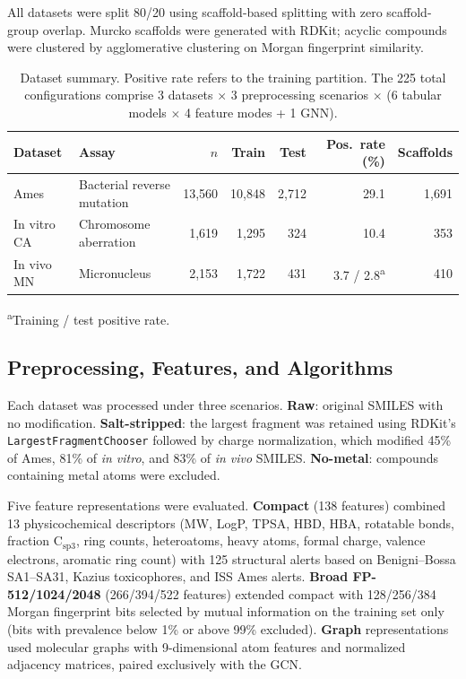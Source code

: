 \documentclass[journal=jacsat,manuscript=article]{achemso}
\begin{document}
All datasets were split 80/20 using scaffold-based splitting\cite{Sheridan_2013} with zero 
scaffold-group overlap. Murcko scaffolds\cite{Bemis_Murcko_1996} were generated with 
RDKit;\cite{RDKit} acyclic compounds were clustered by agglomerative clustering on Morgan 
fingerprint\cite{Rogers_Hahn_2010} similarity.

\begin{table}[ht]
\caption{Dataset summary. Positive rate refers to the training partition. The 225 total 
configurations comprise 3 datasets $\times$ 3 preprocessing scenarios $\times$ (6 tabular 
models $\times$ 4 feature modes + 1 GNN).}
\label{tab:datasets}
\centering
\small
\begin{tabular}{@{}llrrrrr@{}}
\toprule
Dataset & Assay & $n$ & Train & Test & Pos.\ rate (\%) & Scaffolds \\
\midrule
Ames       & Bacterial reverse mutation & 13,560 & 10,848 & 2,712 & 29.1             & 1,691 \\
In vitro CA & Chromosome aberration     &  1,619 &  1,295 &   324 & 10.4             &   353 \\
In vivo MN  & Micronucleus              &  2,153 &  1,722 &   431 & 3.7 / 2.8\textsuperscript{a} & 410 \\
\bottomrule
\end{tabular}

\medskip
\footnotesize
\textsuperscript{a}Training / test positive rate.
\end{table}

\subsection{Preprocessing, Features, and Algorithms}

Each dataset was processed under three scenarios. \textbf{Raw}: original SMILES with no 
modification. \textbf{Salt-stripped}: the largest fragment was retained using RDKit's 
\texttt{LargestFragmentChooser}\cite{RDKit} followed by charge normalization, which 
modified 45\% of Ames, 81\% of \textit{in vitro}, and 83\% of \textit{in vivo} SMILES. \textbf{No-metal}: 
compounds containing metal atoms were excluded.

Five feature representations were evaluated. \textbf{Compact} (138 features) combined 13 
physicochemical descriptors (MW, LogP, TPSA, HBD, HBA, rotatable bonds, fraction 
$\mathrm{C_{sp3}}$, ring counts, heteroatoms, heavy atoms, formal charge, valence electrons, 
aromatic ring count) with 125 structural alerts based on Benigni--Bossa 
SA1--SA31,\cite{Benigni_Bossa_2008,Benigni_2013} Kazius toxicophores,\cite{Kazius_2005} and 
ISS Ames alerts. \textbf{Broad FP-512/1024/2048} (266/394/522 features) extended compact 
with 128/256/384 Morgan fingerprint bits\cite{Rogers_Hahn_2010} selected by mutual 
information\cite{Kraskov_2004} on the training set only (bits with prevalence below 1\% or 
above 99\% excluded). \textbf{Graph} representations used molecular graphs with 9-dimensional 
atom features and normalized adjacency matrices, paired exclusively with the GCN.
\end{document}
